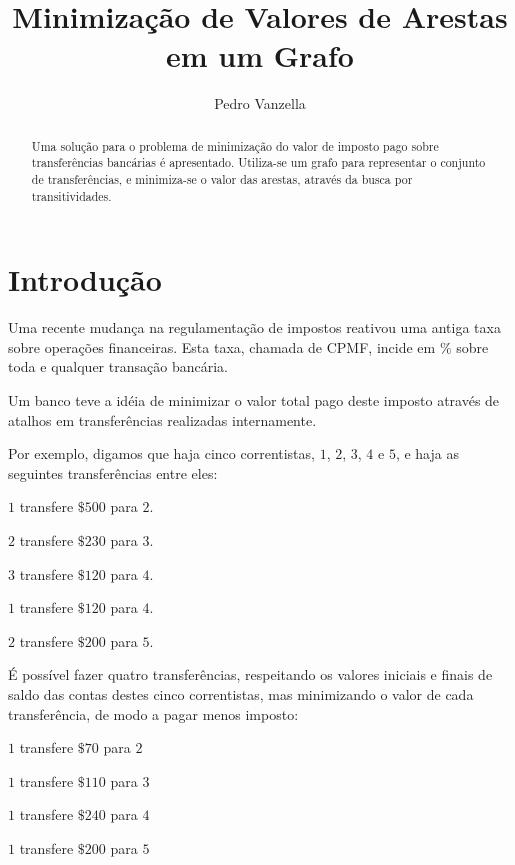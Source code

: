\documentclass[12pt]{article}
\title{Minimização de Valores de Arestas em um Grafo}
\author{Pedro Vanzella}
\begin{document}
\maketitle

\begin{abstract}
  Uma solução para o problema de minimização do valor de imposto pago sobre
  transferências bancárias é apresentado. Utiliza-se um grafo para representar o
  conjunto de transferências, e minimiza-se o valor das arestas, através da
  busca por transitividades.
\end{abstract}

\section{Introdução}\label{sec:intro}

Uma recente mudança na regulamentação de impostos reativou uma antiga taxa sobre
operações financeiras. Esta taxa, chamada de CPMF, incide em $\%$ sobre toda e qualquer
transação bancária.

Um banco teve a idéia de minimizar o valor total pago deste imposto através de
atalhos em transferências realizadas internamente.

Por exemplo, digamos que haja cinco correntistas, $1$, $2$, $3$, $4$
 e $5$, e haja as seguintes transferências entre eles:
\begin{list}{}{}
  \item $1$ transfere $\$500$ para $2$.
  \item $2$ transfere $\$230$ para $3$.
  \item $3$ transfere $\$120$ para $4$.
  \item $1$ transfere $\$120$ para $4$.
  \item $2$ transfere $\$200$ para $5$.
\end{list}


É possível fazer quatro transferências, respeitando os valores iniciais e finais
de saldo das contas destes cinco correntistas, mas minimizando o valor de cada
transferência, de modo a pagar menos imposto:

\begin{list}{}{}
  \item $1$ transfere $\$70$ para $2$
  \item $1$ transfere $\$110$ para $3$
  \item $1$ transfere $\$240$ para $4$
  \item $1$ transfere $\$200$ para $5$
\end{list}
\end{document}
